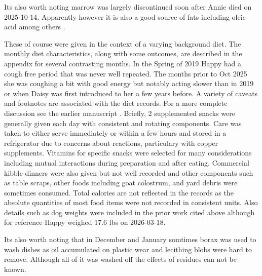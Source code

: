 Its also worth noting marrow was largely discontinued soon 
after Annie died on 2025-10-14.
Apparently however it is also a good source of fats including
oleic acid among others
\cite{Adeyeye_Bone_Marrow_Source_2014}.








These of course were given in the context of a varying background
diet.
The monthly diet characteristics, along with some outcomes,
 are  described in the 
appendix  for several contrasting months.
In the Spring of 2019 Happy had a cough free period that was
never well repeated. The months prior to Oct 2025 she was coughing
a bit with good energy but notably acting slower than in 2019 or
when Daisy was first introduced to her a few years before. 
A variety of caveats and footnotes
are associated with the diet records. For a more complete
discussion see the earlier manuscript \cite{marchywka-MJM-2024-010-0.01rg} .
Briefly, 2 supplemented snacks were generally given each day
with consistent and rotating components. 
Care was taken to either serve immediately or within a few hours
and stored in a refrigerator due to concerns about reactions, 
particulary with copper supplements. Vitamins for specific snacks
were selected for many considerations including mutual interactions
during preparation and after eating.  
Commercial kibble dinners
were also given but not well recorded and other components 
such as table scraps, other foods including goat colostrum,
 and yard debris were sometimes  consumed.
Total calories are not reflected in the records as the absolute
quantities of most food items were not recorded in consistent units. 
Also details such as dog weights were included in the prior work cited
above although for reference Happy weighed 17.6 lbs on 2026-03-18.


Its also worth noting that in December and January somtimes borax
was used to wash dishes as oil accumulated on plastic wear and 
lecithing blobs were hard to remove. Although all of it was washed off
the effects of residues can not be known. 
 
